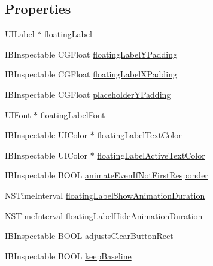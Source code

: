 \subsection*{Properties}
\begin{DoxyCompactItemize}
\item 
U\+I\+Label $\ast$ \hyperlink{interface_j_v_float_labeled_text_field_a63571476c8d5dbbd4103a644d0d060b7}{floating\+Label}
\item 
I\+B\+Inspectable C\+G\+Float \hyperlink{interface_j_v_float_labeled_text_field_a3758fd3387b355cd75a53784e55d0bfe}{floating\+Label\+Y\+Padding}
\item 
I\+B\+Inspectable C\+G\+Float \hyperlink{interface_j_v_float_labeled_text_field_a005ea0687f1048ae375072b0eddd842b}{floating\+Label\+X\+Padding}
\item 
I\+B\+Inspectable C\+G\+Float \hyperlink{interface_j_v_float_labeled_text_field_a503fcd34a364088ba893cd491123ef48}{placeholder\+Y\+Padding}
\item 
U\+I\+Font $\ast$ \hyperlink{interface_j_v_float_labeled_text_field_aa1d2ea55ded3f079d09ee35d34a1b8ea}{floating\+Label\+Font}
\item 
I\+B\+Inspectable U\+I\+Color $\ast$ \hyperlink{interface_j_v_float_labeled_text_field_ac1a4f59f841121c3831be1ee34fcca55}{floating\+Label\+Text\+Color}
\item 
I\+B\+Inspectable U\+I\+Color $\ast$ \hyperlink{interface_j_v_float_labeled_text_field_aa64fbb90cafa476f2fa52eb8a8875aa1}{floating\+Label\+Active\+Text\+Color}
\item 
I\+B\+Inspectable B\+O\+O\+L \hyperlink{interface_j_v_float_labeled_text_field_ac452b0c37e43fa86df3a6d136ab91e93}{animate\+Even\+If\+Not\+First\+Responder}
\item 
N\+S\+Time\+Interval \hyperlink{interface_j_v_float_labeled_text_field_ae2547182365ad7d20fc67623e8148920}{floating\+Label\+Show\+Animation\+Duration}
\item 
N\+S\+Time\+Interval \hyperlink{interface_j_v_float_labeled_text_field_a22466509e0b40b1a7a24aa17d949b79b}{floating\+Label\+Hide\+Animation\+Duration}
\item 
I\+B\+Inspectable B\+O\+O\+L \hyperlink{interface_j_v_float_labeled_text_field_a2eca492728f3ea23c780debb151f27f1}{adjusts\+Clear\+Button\+Rect}
\item 
I\+B\+Inspectable B\+O\+O\+L \hyperlink{interface_j_v_float_labeled_text_field_adbdb4e36a9903fe4fd6772c7f113570a}{keep\+Baseline}
\end{DoxyCompactItemize}


